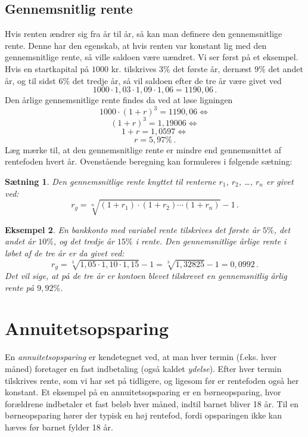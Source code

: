 \documentclass[12pt,oneside,a4paper]{article}
\newtheorem{thm}{Sætning}[section]
\newtheorem{eks}[thm]{Eksempel}
\begin{document}
\subsection{Gennemsnitlig rente}
Hvis renten ændrer sig fra år til år, så kan man definere den gennemsnitlige
rente. Denne har den egenskab, at hvis renten var konstant lig med den
gennemsnitlige rente, så ville saldoen være uændret.  Vi ser først på et
eksempel. Hvis en startkapital på $1000$ kr. tilskrives $3\%$ det første år,
dernæst $9\%$ det andet år, og til sidst $6\%$ det tredje år, så vil saldoen
efter de tre år være givet ved
\[
    1000\cdot 1,03 \cdot 1,09 \cdot 1,06 = 1190,06\,.
\]
Den årlige gennemsnitlige rente findes da ved at løse ligningen
\[
    1000\cdot (1+r)^3 = 1190,06 \Leftrightarrow 
\]
\[
    (1+r)^3=1,19006 \Leftrightarrow
\]
\[
    1+r = 1,0597 \Leftrightarrow
\]
\[
    r = 5,97\%\,.
\]
Læg mærke til, at den gennemsnitlige rente er mindre end gennemsnittet af
rentefoden hvert år.  Ovenstående beregning kan formuleres i følgende sætning:
\begin{tcolorbox}
\begin{thm}
    Den gennemsnitlige rente knyttet til renterne $r_1$, $r_2$, \ldots, $r_n$
    er givet ved:
    \[
        r_g = \sqrt[n]{(1+r_1)\cdot(1+r_2)\cdots(1+r_n)}-1 \,.
    \]
\end{thm}
\end{tcolorbox}
\begin{tcolorbox}
\begin{eks}
    En bankkonto med variabel rente tilskrives det første år $5\%$, det andet
    år $10\%$, og det tredje år $15\%$ i rente. Den gennemsnitlige årlige rente
    i løbet af de tre år er da givet ved:
    \[
        r_g = \sqrt[3]{1,05\cdot1,10\cdot1,15}-1 = \sqrt[3]{1,32825}-1 = 0,0992\,.
    \]
Det vil sige, at på de tre år er kontoen blevet tilskrevet en gennemsnitlig
    årlig rente på $9,92\%$.
\end{eks}
\end{tcolorbox}


\section{Annuitetsopsparing}
En \emph{annuitetsopsparing} er kendetegnet ved, at man hver termin (f.eks. hver
måned) foretager en fast indbetaling (også kaldet \emph{ydelse}). Efter hver
termin tilskrives rente, som vi har set på tidligere, og ligesom før er
rentefoden også her konstant. Et eksempel på en annuitetsopsparing er en
børneopsparing, hvor forældrene indbetaler et fast beløb hver måned, indtil
barnet bliver 18 år. Til en børneopsparing hører der typisk en høj rentefod,
fordi opsparingen ikke kan hæves før barnet fylder 18 år.
\end{document}
